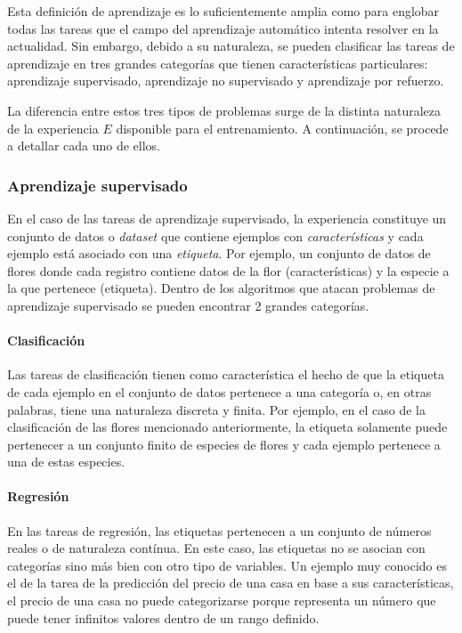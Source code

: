     Esta definición de aprendizaje es lo suficientemente amplia como para englobar todas las tareas 
    que el campo del aprendizaje automático intenta resolver en la actualidad. Sin embargo, debido a 
    su naturaleza, se pueden clasificar las tareas de aprendizaje en tres grandes categorías que tienen
    características particulares: aprendizaje supervisado, aprendizaje no supervisado y aprendizaje por refuerzo.

    La diferencia entre estos tres tipos de problemas surge de la distinta naturaleza de la experiencia $E$ disponible
    para el entrenamiento. A continuación, se procede a detallar cada uno de ellos.

        \subsubsection{Aprendizaje supervisado} \label{sss:supervisado}
        En el caso de las tareas de aprendizaje supervisado, la experiencia constituye un conjunto de datos o \textit{dataset}
        que contiene ejemplos con \textit{características} y cada ejemplo está asociado con una \textit{etiqueta}. Por ejemplo, 
        un conjunto de datos de flores donde cada registro contiene datos de la flor (características) y la especie a la que pertenece (etiqueta). 
        Dentro de los algoritmos que atacan problemas de aprendizaje supervisado se pueden encontrar 2 grandes categorías.
            \paragraph{Clasificación}
            Las tareas de clasificación tienen como característica el hecho de que la etiqueta de cada ejemplo en el 
            conjunto de datos pertenece a una categoría o, en otras palabras, tiene una naturaleza discreta y finita. Por ejemplo, 
            en el caso de la clasificación de las flores mencionado anteriormente, la etiqueta solamente puede pertenecer a un
            conjunto finito de especies de flores y cada ejemplo pertenece a una de estas especies.
            \paragraph{Regresión}
            En las tareas de regresión, las etiquetas pertenecen a un conjunto de números reales o de naturaleza 
            contínua. En este caso, las etiquetas no se asocian con categorías sino más bien con otro tipo de variables. Un 
            ejemplo muy conocido es el de la tarea de la predicción del precio de una casa en base a sus características, el precio 
            de una casa no puede categorizarse porque representa un número que puede tener infinitos valores dentro de un rango definido.
        

